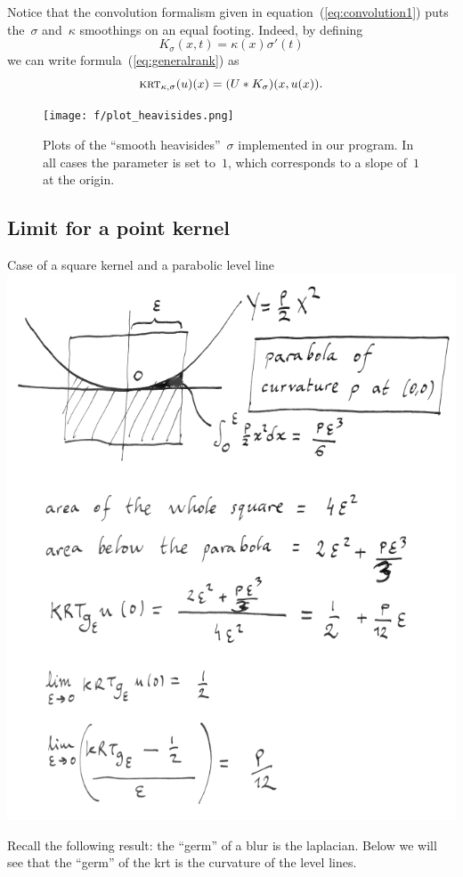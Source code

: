 \documentclass[12pt]{article}                  %
\begin{document}
Notice that the convolution formalism given in
equation~(\ref{eq:convolution1}) puts the~$\sigma$ and~$\kappa$ smoothings
on an equal footing.  Indeed, by defining
\[
	K_\sigma(x,t)=\kappa(x)\sigma'(t)
\]
we can write formula~(\ref{eq:generalrank}) as
\begin{equation}\label{eq:convolution2}
	\textsc{krt}_{\kappa,\sigma}(u)(x)=(U*K_\sigma)(x,u(x)).
\end{equation}


\begin{figure}
	\centering
	\texttt{[image: f/plot\_heavisides.png]}
	\caption{Plots of the ``smooth heavisides''~$\sigma$ implemented in
	our program.  In all cases the parameter is set to~$1$, which
	corresponds to a slope of~$1$ at the origin.}
	\label{fig:heavisides}
\end{figure}


\subsection{Limit for a point kernel}

Case of a square kernel and a parabolic level line\\
\includegraphics[width=0.6\linewidth]{f/pcurv.png}




Recall the following result: the ``germ'' of a blur is the laplacian.  Below
we will see that the ``germ'' of the krt is the curvature of the level
lines.
\end{document}
